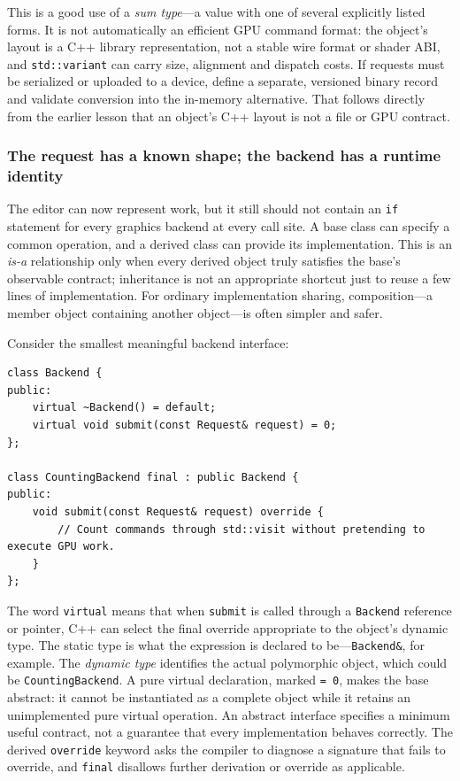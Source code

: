 This is a good use of a \emph{sum type}---a value with one of several explicitly listed forms. It is not automatically an efficient GPU command format: the object's layout is a C++ library representation, not a stable wire format or shader ABI, and \texttt{std::variant} can carry size, alignment and dispatch costs. If requests must be serialized or uploaded to a device, define a separate, versioned binary record and validate conversion into the in-memory alternative. That follows directly from the earlier lesson that an object's C++ layout is not a file or GPU contract.

\subsubsection{The request has a known shape; the backend has a runtime identity}\label{the-request-has-a-known-shape-the-backend-has-a-runtime-identity}

The editor can now represent work, but it still should not contain an \texttt{if} statement for every graphics backend at every call site. A base class can specify a common operation, and a derived class can provide its implementation. This is an \emph{is-a} relationship only when every derived object truly satisfies the base's observable contract; inheritance is not an appropriate shortcut just to reuse a few lines of implementation. For ordinary implementation sharing, composition---a member object containing another object---is often simpler and safer.

Consider the smallest meaningful backend interface:

\begin{verbatim}
class Backend {
public:
    virtual ~Backend() = default;
    virtual void submit(const Request& request) = 0;
};

class CountingBackend final : public Backend {
public:
    void submit(const Request& request) override {
        // Count commands through std::visit without pretending to execute GPU work.
    }
};
\end{verbatim}

The word \texttt{virtual} means that when \texttt{submit} is called through a \texttt{Backend} reference or pointer, C++ can select the final override appropriate to the object's dynamic type. The static type is what the expression is declared to be---\texttt{Backend\&}, for example. The \emph{dynamic type} identifies the actual polymorphic object, which could be \texttt{CountingBackend}. A pure virtual declaration, marked \texttt{=\ 0}, makes the base abstract: it cannot be instantiated as a complete object while it retains an unimplemented pure virtual operation. An abstract interface specifies a minimum useful contract, not a guarantee that every implementation behaves correctly. The derived \texttt{override} keyword asks the compiler to diagnose a signature that fails to override, and \texttt{final} disallows further derivation or override as applicable.

